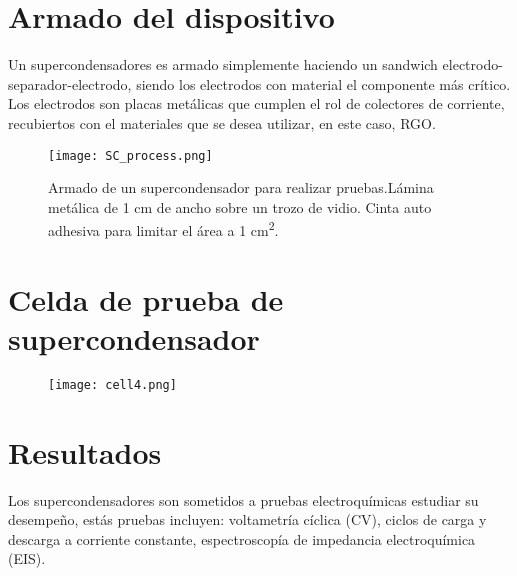 
\section{Armado del dispositivo}
Un supercondensadores es armado simplemente haciendo un sandwich electrodo-separador-electrodo, siendo los electrodos con material el componente más crítico. Los electrodos son placas metálicas que cumplen el rol de colectores de corriente, recubiertos con el materiales que se desea utilizar, en este caso, RGO.

\begin{figure}[h!]
	\centering
	\texttt{[image: SC\_process.png]}
	\label{fig:SC_process}
	\caption{Armado de un supercondensador para realizar pruebas.\protect{}Lámina metálica de 1 cm de ancho sobre un trozo de vidio. \protect{} Cinta auto adhesiva para limitar el área a 1 cm\protect\textsuperscript{2}.}
\end{figure}
\section{Celda de prueba de supercondensador}

\begin{figure}[h!]
	\centering
	\texttt{[image: cell4.png]}
	\label{fig:celda_de_pruebas_SC}
\end{figure}


\section{Resultados}
Los supercondensadores son sometidos a pruebas electroquímicas estudiar su desempeño, estás pruebas incluyen: voltametría cíclica (CV), ciclos de carga y descarga a corriente constante, espectroscopía de impedancia electroquímica (EIS).
